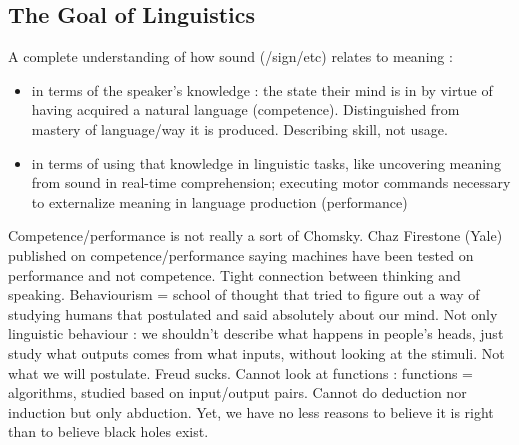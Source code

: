 \documentclass{cours}
\begin{document}
\subsection{The Goal of Linguistics}
A complete understanding of how sound (/sign/etc) relates to meaning\! : 
\begin{itemize}
    \item in terms of the speaker's knowledge\! : the state their mind is in by virtue of having acquired a natural language (competence). Distinguished from mastery of language/way it is produced. Describing skill, not usage. 
    \item in terms of using that knowledge in linguistic tasks, like uncovering meaning from sound in real-time comprehension; executing motor commands necessary to externalize meaning in language production (performance)
\end{itemize}
Competence/performance is not really a sort of Chomsky. Chaz Firestone (Yale) published on competence/performance saying machines have been tested on performance and not competence. 
Tight connection between thinking and speaking. 
Behaviourism = school of thought that tried to figure out a way of studying humans that postulated and said absolutely about our mind. Not only linguistic behaviour\! : we shouldn't describe what happens in people's heads, just study what outputs comes from what inputs, without looking at the stimuli. Not what we will postulate. 
Freud sucks.
Cannot look at functions\! : functions = algorithms, studied based on input/output pairs. Cannot do deduction nor induction but only abduction. Yet, we have no less reasons to believe it is right than to believe black holes exist.
\end{document}
